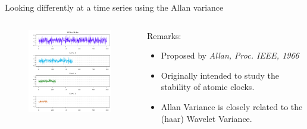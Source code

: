 \documentclass[envcountsect,usenames,dvipsnames]{beamer}
\theoremstyle{mystyle}
\begin{document}
\begin{frame}{Looking differently at a time series using the Allan variance}
 	\begin{columns}
		\begin{column}{0.6\textwidth}
			
			\vspace{-0.6cm}
				\begin{figure}
	    			\centering
	  				\includegraphics[width = 7cm]{Images/AV}
				\end{figure}
	
			\end{column}
			\begin{column}{0.35\textwidth}
				\begin{block}{Remarks:}
		\begin{itemize}
		\item Proposed by \textit{Allan, Proc. IEEE, 1966}
		
		\item Originally intended to study the stability of atomic clocks.
		
		\item Allan Variance is closely related to the (haar) Wavelet Variance.
		\end{itemize}
	\end{block}
		\end{column}
		\end{columns}
\end{frame}
\end{document}
